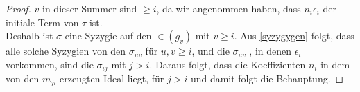 \documentclass{article}
\begin{document}
\begin{thm}
\begin{proof}
			\( v \)
			in dieser Summer sind 
			\( \ge i \),
			da wir angenommen haben,
			dass 
			\( n_{i} \epsilon_{i} \)
			der initiale Term von 
			\( \tau \)
			ist. \\
			Deshalb ist 
			\( \sigma \)
			eine Syzygie auf den
			\( \in\left( g_{v} \right) \)
			mit 
			\( v \ge i\).
			Aus  \ref{syzygygen} 
			folgt, 
			dass alle solche Syzygien von den
			\( \sigma_{uv} \)
			f\"ur 
			\( u,v \ge i \),
			und die 
			\( \sigma_{uv} \) ,
			in denen 
			\( \epsilon_{i} \) 
			vorkommen,
			sind die
			\( \sigma_{ij}\)
			mit
			\( j > i \).
			Daraus folgt, 
			dass die Koeffizienten 
			\(n_{i}\)
			in dem von den 
			\(m_{ji}\) 
			erzeugten Ideal liegt,
			f\"ur 
			\( j> i \)
			und damit folgt die Behauptung.
		\end{proof}
	\end{thm}


\end{document}
